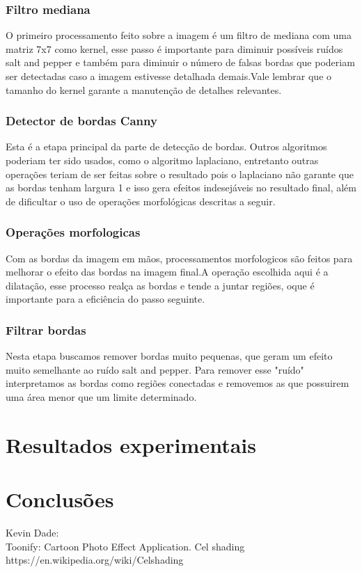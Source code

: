 \documentclass[10pt,technote]{IEEEtran}
\begin{document}
		\subsubsection{Filtro mediana}
			O primeiro processamento feito sobre a imagem é um filtro de mediana com uma matriz 7x7 como kernel, esse passo é importante para diminuir possíveis ruídos salt and pepper e também para diminuir o número de falsas bordas que poderiam ser detectadas caso a imagem estivesse detalhada demais.Vale lembrar que o tamanho do kernel garante a manutenção de detalhes relevantes.\\
		\subsubsection{Detector de bordas Canny}
			Esta é a etapa principal da parte de detecção de bordas. Outros algoritmos poderiam ter sido usados, como o algoritmo laplaciano, entretanto outras operações teriam de ser feitas sobre o resultado pois o laplaciano não garante que as bordas tenham largura 1 e isso gera efeitos indesejáveis no resultado final, além de dificultar o uso de operações morfológicas descritas a seguir.\\
		\subsubsection{Operações morfologicas}
			Com as bordas da imagem em mãos, processamentos morfologicos são feitos para melhorar o efeito das bordas na imagem final.A operação escolhida aqui é a dilatação, esse processo realça as bordas e tende a juntar regiões, oque  é importante para a eficiência do passo seguinte.\\
		\subsubsection{Filtrar bordas}
			Nesta etapa buscamos remover bordas muito pequenas, que geram um efeito muito semelhante ao ruído salt and pepper. Para remover esse "ruído" interpretamos as bordas como regiões conectadas e removemos as que possuirem uma área menor que um limite determinado.  
\section{Resultados experimentais}

\section{Conclusões}

\begin{thebibliography}{20}
	Kevin Dade:\\
	Toonify: Cartoon Photo Effect Application.
	Cel shading\\
	https://en.wikipedia.org/wiki/Celshading


\end{thebibliography}
\end{document}
